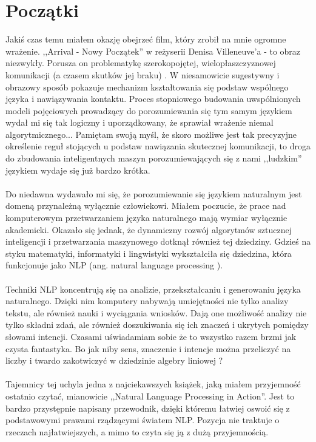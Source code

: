 \section{Początki}
Jakiś czas temu miałem okazję obejrzeć film, który zrobił na mnie ogromne wrażenie. ,,Arrival - Nowy Początek'' w reżyserii Denisa Villeneuve’a - to obraz niezwykły.
Porusza on problematykę szerokopojętej, wielopłaszczyznowej komunikacji (a czasem skutków jej braku) . W niesamowicie sugestywny i obrazowy sposób pokazuje mechanizm kształtowania się podstaw wspólnego języka i nawiązywania kontaktu.
Proces stopniowego budowania uwspólnionych modeli pojęciowych prowadzący do porozumiewania się tym samym językiem wydał mi się tak logiczny i uporządkowany, że sprawiał wrażenie niemal algorytmicznego...
Pamiętam swoją myśl, że skoro możliwe jest tak precyzyjne określenie
reguł stojących u podstaw nawiązania skutecznej komunikacji, to droga do zbudowania inteligentnych maszyn porozumiewających się z nami ,,ludzkim''
językiem wydaje się już bardzo krótka.

\paragraph{}
Do niedawna wydawało mi się, że porozumiewanie się językiem naturalnym jest domeną przynależną wyłącznie człowiekowi.
Miałem poczucie, że prace nad komputerowym przetwarzaniem języka naturalnego mają wymiar wyłącznie akademicki.
Okazało się jednak, że dynamiczny rozwój algorytmów sztucznej inteligencji i
przetwarzania maszynowego dotknął również tej dziedziny. Gdzieś na styku matematyki, informatyki i lingwistyki wykształciła się
dziedzina, która funkcjonuje jako NLP (ang.  natural language processing ).
	
\paragraph{}
Techniki NLP koncentrują się na analizie, przekształcaniu i generowaniu języka naturalnego.
Dzięki nim komputery nabywają umiejętności nie tylko analizy tekstu, ale również nauki i wyciągania wniosków.
Dają one możliwość analizy nie tylko składni zdań, ale również doszukiwania się ich znaczeń i ukrytych pomiędzy słowami intencji.
Czasami uświadamiam sobie że to wszystko razem brzmi jak czysta fantastyka. Bo jak niby sens, znaczenie i intencje można przeliczyć na liczby i twardo
zakotwiczyć w dziedzinie algebry liniowej ?
\paragraph{}
Tajemnicy tej uchyla jedna z najciekawszych książek, jaką miałem przyjemność ostatnio czytać, mianowicie ,,Natural Language Processing in Action''.
Jest to bardzo przystępnie napisany przewodnik, dzięki któremu łatwiej oswoić się z podstawowymi prawami rządzącymi światem NLP.
Pozycja nie traktuje o rzeczach najłatwiejszych, a mimo to czyta się ją z dużą przyjemnością.
